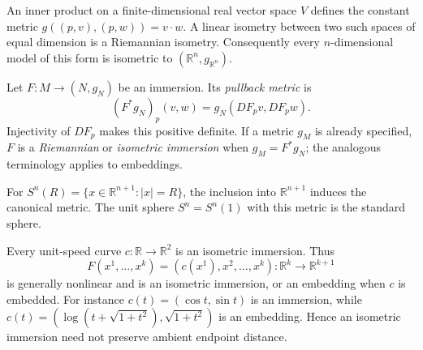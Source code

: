 \begin{example}
  \label{ex:pet-ch1-inner-product-space}
  \leanok
  An inner product on a finite-dimensional real vector space $V$ defines the
  constant metric $g((p,v),(p,w))=v\cdot w$. A linear isometry between two
  such spaces of equal dimension is a Riemannian isometry. Consequently every
  $n$-dimensional model of this form is isometric to
  $(\mathbb{R}^n,g_{\mathbb{R}^n})$.
\end{example}

\begin{definition}
  \label{def:pet-ch1-pullback-metric}
  \leanok
  Let $F:M\to(N,g_N)$ be an immersion. Its \emph{pullback metric} is
  \[
    (F^*g_N)_p(v,w)=g_N(DF_pv,DF_pw).
  \]
  Injectivity of $DF_p$ makes this positive definite. If a metric $g_M$ is
  already specified, $F$ is a \emph{Riemannian} or \emph{isometric immersion}
  when $g_M=F^*g_N$; the analogous terminology applies to embeddings.
\end{definition}

\begin{example}
  \label{ex:pet-ch1-sphere}
  \leanok
  For
  $S^n(R)=\{x\in\mathbb{R}^{n+1}:|x|=R\}$, the inclusion into
  $\mathbb{R}^{n+1}$ induces the canonical metric. The unit sphere
  $S^n=S^n(1)$ with this metric is the standard sphere.
\end{example}

\begin{remark}
  \label{rem:pet-ch1-nonlinear-isometric-immersion}
  \leanok
  Every unit-speed curve $c:\mathbb{R}\to\mathbb{R}^2$ is an isometric
  immersion. Thus
  \[
    F(x^1,\ldots,x^k)=(c(x^1),x^2,\ldots,x^k)
      :\mathbb{R}^k\to\mathbb{R}^{k+1}
  \]
  is generally nonlinear and is an isometric immersion, or an embedding when
  $c$ is embedded. For instance $c(t)=(\cos t,\sin t)$ is an immersion, while
  $c(t)=(\log(t+\sqrt{1+t^2}),\sqrt{1+t^2})$ is an embedding. Hence an
  isometric immersion need not preserve ambient endpoint distance.
\end{remark}

